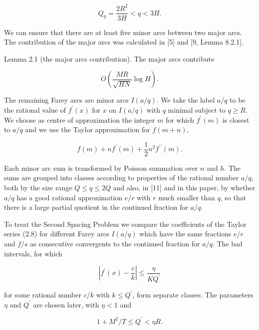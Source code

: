 \documentclass[10pt]{article}
\begin{document}
\begin{equation*}
Q_{0}=\frac{2R^{2}}{3H}<q<3H. \tag{2.6}
\end{equation*}


We can ensure that there are at least five minor arcs between two major arcs. The contribution of the major arcs was calculated in [5] and [9, Lemma 8.2.1].

Lemma 2.1 (the major arcs contribution). The major arcs contribute


\begin{equation*}
O\left(\frac{M R}{\sqrt{H N}} \log H\right). \tag{2.7}
\end{equation*}


The remaining Farey arcs are minor arcs $I(a / q)$. We take the label $a / q$ to be the rational value of $f^{\prime}(x)$ for $x$ on $I(a / q)$ with $q$ minimal subject to $q \geqslant R$. We choose as centre of approximation the integer $m$ for which $f^{\prime}(m)$ is closest to $a / q$ and we use the Taylor approximation for $f(m+n)$,


\begin{equation*}
f(m)+n f^{\prime}(m)+\frac{1}{2} n^{2} f^{\prime \prime}(m). \tag{2.8}
\end{equation*}


Each minor arc sum is transformed by Poisson summation over $n$ and $h$. The sums are grouped into classes according to properties of the rational number $a / q$, both by the size range $Q \leqslant q \leqslant 2 Q$ and also, in [11] and in this paper, by whether $a / q$ has a good rational approximation $e / r$ with $r$ much smaller than $q$, so that there is a large partial quotient in the continued fraction for $a / q$.

To treat the Second Spacing Problem we compare the coefficients of the Taylor series (2.8) for different Farey arcs $I(a / q)$ which have the same fractions $e / r$ and $f / s$ as consecutive convergents to the continued fraction for $a / q$. The bad intervals, for which


\begin{equation*}
\left|f^{\prime}(x)-\frac{c}{k}\right| \leqslant \frac{\eta}{K Q^{\prime}} \tag{2.9}
\end{equation*}


for some rational number $c / k$ with $k \leqslant Q^{\prime}$, form separate classes. The parameters $\eta$ and $Q^{\prime}$ are chosen later, with $\eta<1$ and


\begin{equation*}
1+M^{2} / T \leqslant Q^{\prime}<\eta R. \tag{2.10}
\end{equation*}
\end{document}
